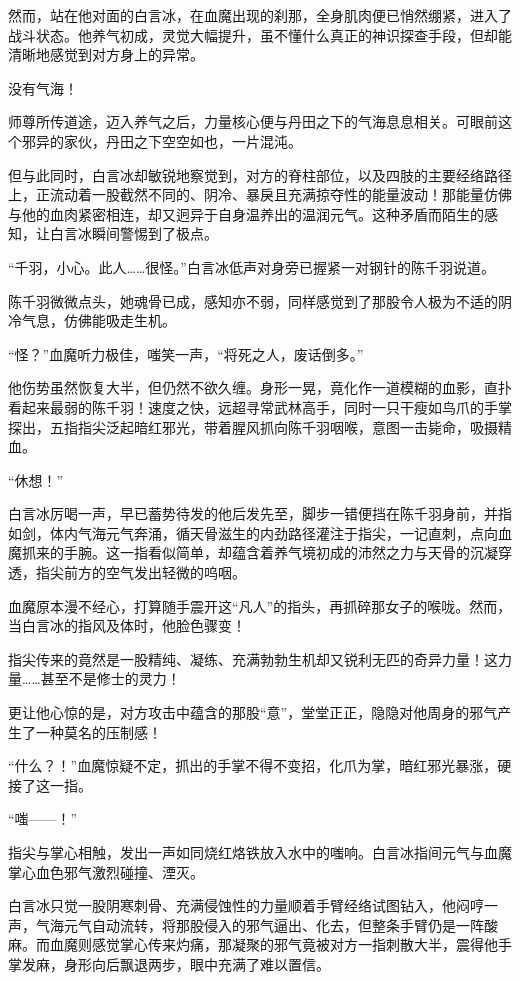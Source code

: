 然而，站在他对面的白言冰，在血魔出现的刹那，全身肌肉便已悄然绷紧，进入了战斗状态。他养气初成，灵觉大幅提升，虽不懂什么真正的神识探查手段，但却能清晰地感觉到对方身上的异常。

没有气海！

师尊所传道途，迈入养气之后，力量核心便与丹田之下的气海息息相关。可眼前这个邪异的家伙，丹田之下空空如也，一片混沌。

但与此同时，白言冰却敏锐地察觉到，对方的脊柱部位，以及四肢的主要经络路径上，正流动着一股截然不同的、阴冷、暴戾且充满掠夺性的能量波动！那能量仿佛与他的血肉紧密相连，却又迥异于自身温养出的温润元气。这种矛盾而陌生的感知，让白言冰瞬间警惕到了极点。

“千羽，小心。此人……很怪。”白言冰低声对身旁已握紧一对钢针的陈千羽说道。

陈千羽微微点头，她魂骨已成，感知亦不弱，同样感觉到了那股令人极为不适的阴冷气息，仿佛能吸走生机。

“怪？”血魔听力极佳，嗤笑一声，“将死之人，废话倒多。”

他伤势虽然恢复大半，但仍然不欲久缠。身形一晃，竟化作一道模糊的血影，直扑看起来最弱的陈千羽！速度之快，远超寻常武林高手，同时一只干瘦如鸟爪的手掌探出，五指指尖泛起暗红邪光，带着腥风抓向陈千羽咽喉，意图一击毙命，吸摄精血。

“休想！”

白言冰厉喝一声，早已蓄势待发的他后发先至，脚步一错便挡在陈千羽身前，并指如剑，体内气海元气奔涌，循天骨滋生的内劲路径灌注于指尖，一记直刺，点向血魔抓来的手腕。这一指看似简单，却蕴含着养气境初成的沛然之力与天骨的沉凝穿透，指尖前方的空气发出轻微的呜咽。

血魔原本漫不经心，打算随手震开这“凡人”的指头，再抓碎那女子的喉咙。然而，当白言冰的指风及体时，他脸色骤变！

指尖传来的竟然是一股精纯、凝练、充满勃勃生机却又锐利无匹的奇异力量！这力量……甚至不是修士的灵力！

更让他心惊的是，对方攻击中蕴含的那股“意”，堂堂正正，隐隐对他周身的邪气产生了一种莫名的压制感！

“什么？！”血魔惊疑不定，抓出的手掌不得不变招，化爪为掌，暗红邪光暴涨，硬接了这一指。

“嗤——！”

指尖与掌心相触，发出一声如同烧红烙铁放入水中的嗤响。白言冰指间元气与血魔掌心血色邪气激烈碰撞、湮灭。

白言冰只觉一股阴寒刺骨、充满侵蚀性的力量顺着手臂经络试图钻入，他闷哼一声，气海元气自动流转，将那股侵入的邪气逼出、化去，但整条手臂仍是一阵酸麻。而血魔则感觉掌心传来灼痛，那凝聚的邪气竟被对方一指刺散大半，震得他手掌发麻，身形向后飘退两步，眼中充满了难以置信。

